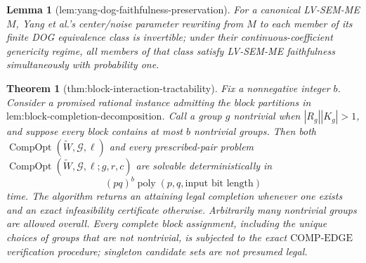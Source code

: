 \documentclass{article}
\newtheorem{theorem}{Theorem}
\newtheorem{lemma}{Lemma}
\begin{document}
\begin{lemma}[lem:yang-dog-faithfulness-preservation]\label{lem:yang-dog-faithfulness-preservation}
For a canonical LV-SEM-ME \(M\), Yang et al.'s center/noise parameter rewriting from \(M\) to each member of its finite DOG equivalence class is invertible; under their continuous-coefficient genericity regime, all members of that class satisfy LV-SEM-ME faithfulness simultaneously with probability one.
\end{lemma}

\begin{theorem}[thm:block-interaction-tractability]\label{thm:block-interaction-tractability}
Fix a nonnegative integer \(b\). Consider a promised rational instance admitting the block partitions in \(\text{lem:block-completion-decomposition}\). Call a group \(g\) nontrivial when \(|R_g||K_g|>1\), and suppose every block contains at most \(b\) nontrivial groups. Then both \(\operatorname{CompOpt}(\widetilde W,\mathcal G,\ell)\) and every prescribed-pair problem \(\operatorname{CompOpt}(\widetilde W,\mathcal G,\ell;g,r,c)\) are solvable deterministically in
\[
(pq)^b\operatorname{poly}(p,q,\text{input bit length})
\]
time. The algorithm returns an attaining legal completion whenever one exists and an exact infeasibility certificate otherwise. Arbitrarily many nontrivial groups are allowed overall. Every complete block assignment, including the unique choices of groups that are not nontrivial, is subjected to the exact \(\mathrm{COMP\text{-}EDGE}\) verification procedure; singleton candidate sets are not presumed legal.
\end{theorem}
\end{document}
